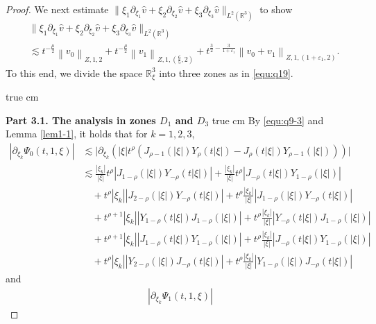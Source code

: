 \documentclass[10pt,a4paper]{amsart}
\newcommand{\R}{\mathbb R}
\newcommand{\f}{\frac}
\newcommand{\p}{\partial}
\begin{document}
\begin{proof}
We next estimate $\|\xi_1\p_{\xi_1}\hat{v}+\xi_2\p_{\xi_2}\hat{v}+\xi_3\p_{\xi_3}\hat{v}\|_{L^2(\R^3)}$
to show
\begin{equation}\label{e:q31}
\begin{aligned}
&\|\xi_1\p_{\xi_1}\hat{v}+\xi_2\p_{\xi_2}\hat{v}+\xi_3\p_{\xi_3}\hat{v}\|_{L^2(\R^3)} \\&\lesssim t^{-\f{\mu}{2}}\left\|v_0\right\|_{Z, 1, 2}+t^{-\f{\mu}{2}}\left\|v_1\right\|_{Z, 1,(\f65, 2)}+t^{\f32-\f{3}{1+\varepsilon_1}}\left\|v_0+v_1\right\|_{Z, 1,(1+\varepsilon_1, 2)}.
\end{aligned}
\end{equation}
To this end, we
divide the space $\R_{\xi}^3$ into three zones as in \eqref{equ:q19}.

 true cm

{\bf Part 3.1.  The analysis  in zones $D_1$ and  $D_3$}
 true cm
By \eqref{equ:q9-3} and Lemma \ref{lem1-1}, it holds   that for $k=1,2,3$,
\begin{equation}\label{e:q32}
\begin{aligned}
|\partial_{\xi_k} \Psi_0(t, 1, \xi)|
& \lesssim  \big| \partial_{\xi_k} \left( |\xi| t^\rho \left( J_{\rho-1}(|\xi|) Y_\rho(t|\xi|)
- J_\rho(t|\xi|) Y_{\rho-1}(|\xi|) \right) \right) \big| \\
& \lesssim  \frac{|\xi_k|}{|\xi|} t^\rho \left| J_{1-\rho}(|\xi|) Y_{-\rho}(t|\xi|) \right|
+ \frac{|\xi_k|}{|\xi|} t^\rho \left| J_{-\rho}(t|\xi|) Y_{1-\rho}(|\xi|) \right| \\
& \quad + t^\rho |\xi_k| \left| J_{2-\rho}(|\xi|) Y_{-\rho}(t|\xi|) \right|
+ t^\rho \frac{|\xi_k|}{|\xi|} \left| J_{1-\rho}(|\xi|) Y_{-\rho}(t|\xi|) \right| \\
& \quad + t^{\rho+1} |\xi_k| \left| Y_{1-\rho}(t|\xi|) J_{1-\rho}(|\xi|) \right|
+ t^\rho \frac{|\xi_k|}{|\xi|} \left| Y_{-\rho}(t|\xi|) J_{1-\rho}(|\xi|) \right| \\
& \quad + t^{\rho+1} |\xi_k| \left| J_{1-\rho}(t|\xi|) Y_{1-\rho}(|\xi|) \right|
+ t^\rho \frac{|\xi_k|}{|\xi|} \left| J_{-\rho}(t|\xi|) Y_{1-\rho}(|\xi|) \right| \\
& \quad + t^\rho |\xi_k| \left| Y_{2-\rho}(|\xi|) J_{-\rho}(t|\xi|) \right|
+ t^\rho \frac{|\xi_k|}{|\xi|} \left| Y_{1-\rho}(|\xi|) J_{-\rho}(t|\xi|) \right|
\end{aligned}
\end{equation}
and
\begin{equation}\label{e:q33}
\begin{aligned}
|\partial_{\xi_k} \Psi_1(t, 1, \xi)|

\end{aligned}
\end{equation}
\end{proof}
\end{document}
